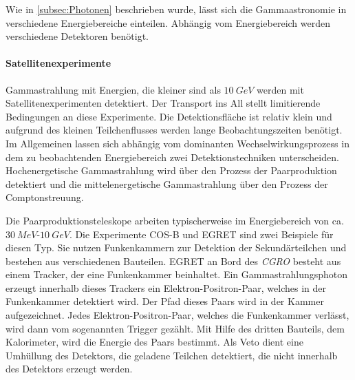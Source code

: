 % 

Wie in \ref{subsec:Photonen} beschrieben wurde, lässt sich die Gammaastronomie in verschiedene Energiebereiche einteilen.
Abhängig vom Energiebereich werden verschiedene Detektoren benötigt.

\paragraph{Satellitenexperimente}
Gammastrahlung mit Energien, die kleiner sind als $\SI{10}{GeV}$ werden mit Satellitenexperimenten detektiert.
Der Transport ins All stellt limitierende Bedingungen an diese Experimente.
Die Detektionsfläche ist relativ klein und aufgrund des kleinen Teilchenflusses werden lange Beobachtungszeiten benötigt.
Im Allgemeinen lassen sich abhängig vom dominanten Wechselwirkungsprozess in dem zu beobachtenden Energiebereich zwei Detektionstechniken unterscheiden.
Hochenergetische Gammastrahlung wird über den Prozess der Paarproduktion detektiert und die mittelenergetische Gammastrahlung über den Prozess der Comptonstreuung.\cite{Weekes}

Die Paarproduktionsteleskope arbeiten typischerweise im Energiebereich von ca. $\SI{30}{MeV}$-$\SI{10}{GeV}$.
Die Experimente COS-B \cite{CosB} und EGRET \cite{EGRET} sind zwei Beispiele für diesen Typ.
Sie nutzen Funkenkammern zur Detektion der Sekundärteilchen und bestehen aus verschiedenen Bauteilen.
EGRET \cite{EGRET} an Bord des \textit{CGRO} besteht aus einem Tracker, der eine Funkenkammer beinhaltet.
Ein Gammastrahlungsphoton erzeugt innerhalb dieses Trackers ein Elektron-Positron-Paar, welches in der Funkenkammer detektiert wird.
Der Pfad dieses Paars wird in der Kammer aufgezeichnet.
Jedes Elektron-Positron-Paar, welches die Funkenkammer verlässt, wird dann vom sogenannten Trigger gezählt.
Mit Hilfe des dritten Bauteils, dem Kalorimeter, wird die Energie des Paars bestimmt.
Als Veto dient eine Umhüllung des Detektors, die geladene Teilchen detektiert, die nicht innerhalb des Detektors erzeugt werden.\cite{Weekes}

